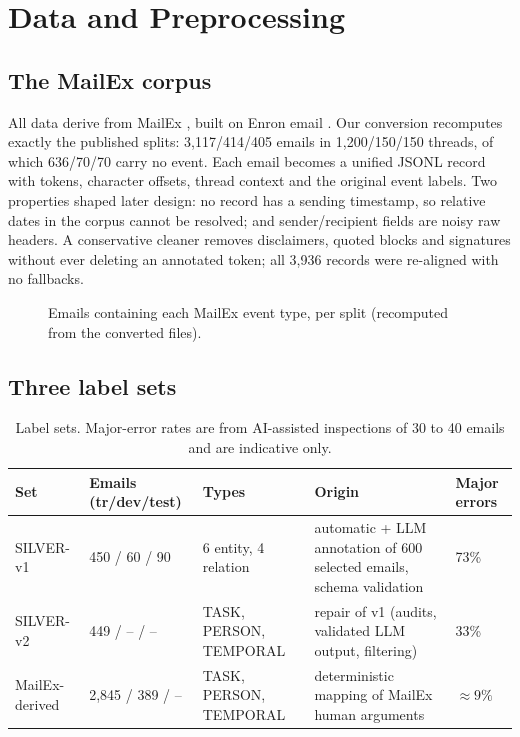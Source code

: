 \chapter{Data and Preprocessing}
\label{ch:data}

\section{The MailEx corpus}
All data derive from MailEx \citep{srivastava2023mailex}, built on Enron email \citep{klimt2004enron}. Our conversion recomputes exactly the published splits: 3,117/414/405 emails in 1,200/150/150 threads, of which 636/70/70 carry no event. Each email becomes a unified JSONL record with tokens, character offsets, thread context and the original event labels. Two properties shaped later design: no record has a sending timestamp, so relative dates in the corpus cannot be resolved; and sender/recipient fields are noisy raw headers. A conservative cleaner removes disclaimers, quoted blocks and signatures without ever deleting an annotated token; all 3,936 records were re-aligned with no fallbacks.


\begin{figure}[htbp]
\centering
{}
\caption{Emails containing each MailEx event type, per split (recomputed from the converted files).}
\label{fig:events}
\end{figure}
\section{Three label sets}
\begin{table}[htbp]
\centering
\caption{Label sets. Major-error rates are from AI-assisted inspections of 30 to 40 emails and are indicative only.}
\label{tab:labelsets}
\footnotesize
\begin{tabularx}{\linewidth}{@{}p{24mm}p{24mm}p{24mm}Lp{14mm}@{}}
\toprule
Set & Emails (tr/dev/test) & Types & Origin & Major errors \\
\midrule
SILVER-v1 & 450 / 60 / 90 & 6 entity, 4 relation & automatic + LLM annotation of 600 selected emails, schema validation & 73\% \\
SILVER-v2 & 449 / -- / -- & TASK, PERSON, TEMPORAL & repair of v1 (audits, validated LLM output, filtering) & 33\% \\
MailEx-derived & 2,845 / 389 / -- & TASK, PERSON, TEMPORAL & deterministic mapping of MailEx human arguments & ${\approx}9\%$ \\
\bottomrule
\end{tabularx}
\end{table}

